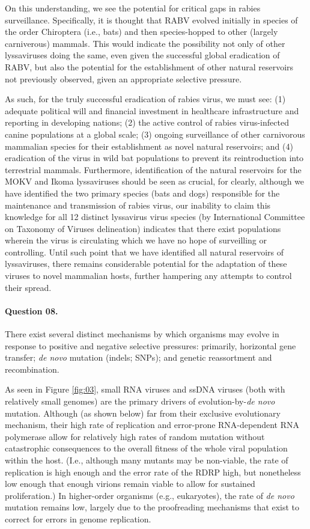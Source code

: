 \documentclass[11pt,letterpaper,final] {article}
\begin{document}
On this understanding, we see the potential for critical gaps in rabies surveillance. Specifically, it is thought that RABV evolved initially in species of the order Chiroptera (i.e., bats) and then species-hopped to other (largely carniverous) mammals. This would indicate the possibility not only of other lyssaviruses doing the same, even given the successful global eradication of RABV, but also the potential for the establishment of other natural reservoirs not previously observed, given an appropriate selective pressure.

As such, for the truly successful eradication of rabies virus, we must see: (1) adequate political will and financial investment in healthcare infrastructure and reporting in developing nations; (2) the active control of rabies virus-infected canine populations at a global scale; (3) ongoing surveillance of other carnivorous mammalian species for their establishment as novel natural reservoirs; and (4) eradication of the virus in wild bat populations to prevent its reintroduction into terrestrial mammals. Furthermore, identification of the natural reservoirs for the MOKV and Ikoma lyssaviruses should be seen as crucial, for clearly, although we have identified the two primary species (bats and dogs) responsible for the maintenance and transmission of rabies virus, our inability to claim this knowledge for all 12 distinct lyssavirus virus species (by International Committee on Taxonomy of Viruses delineation) indicates that there exist populations wherein the virus is circulating which we have no hope of surveilling or controlling. Until such point that we have identified all natural reservoirs of lyssaviruses, there remains considerable potential for the adaptation of these viruses to novel mammalian hosts, further hampering any attempts to control their spread.

\paragraph{Question 08.} There exist several distinct mechanisms by which organisms may evolve in response to positive and negative selective pressures: primarily, horizontal gene transfer; \textit{de novo} mutation (indels; SNPs); and genetic reassortment and recombination.

As seen in Figure \ref{fig:03}, small RNA viruses and ssDNA viruses (both with relatively small genomes) are the primary drivers of evolution-by-\textit{de novo} mutation. Although (as shown below) far from their exclusive evolutionary mechanism, their high rate of replication and error-prone RNA-dependent RNA polymerase allow for relatively high rates of random mutation without catastrophic consequences to the overall fitness of the whole viral population within the host. (I.e., although many mutants may be non-viable, the rate of replication is high enough and the error rate of the RDRP high, but nonetheless low enough that enough virions remain viable to allow for sustained proliferation.) In higher-order organisms (e.g., eukaryotes), the rate of \textit{de novo} mutation remains low, largely due to the proofreading mechanisms that exist to correct for errors in genome replication.
\end{document}
